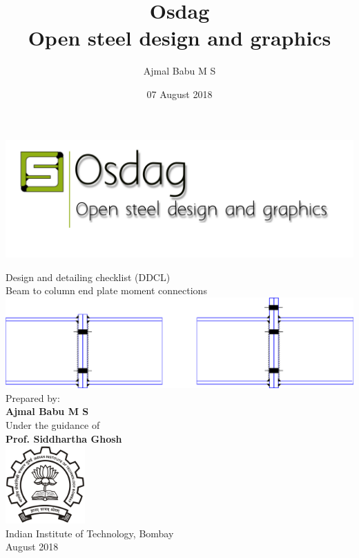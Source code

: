 \documentclass[11.5pt,a4paper,oneside]{report}
\begin{document}
	\title{Osdag\\ Open steel design and graphics}
	\author{Ajmal Babu M S}
	\date{07 August 2018}
\pagestyle{fancy}
\lhead{}
\chead{}
\cfoot{}
\rfoot{\thepage}
\renewcommand{\headrulewidth}{2pt}
\renewcommand{\footrulewidth}{1pt}
\newcommand{\univ}{Indian Institute of Technology, Bombay}
\begin{titlepage}
	\begin{center}
		\begin{center}
			\includegraphics {logoOsdag.png}
		\end{center}
	
			{\LARGE {Design and detailing checklist (DDCL)}}\\
			\vspace{1cm}
			{\LARGE {Beam to column end plate  moment connections}} \\
			\vspace{1cm}		
			\includegraphics[width=7in]{FP_OWE.png} \\	
			\vspace{3cm}
			 {\small {Prepared by:}} \\
			 {\Large \textbf {Ajmal Babu M S}} \\	
			\vspace{0.5cm}	
			{\small {Under the guidance of} }\\
			{\Large \textbf {Prof. Siddhartha Ghosh}} \\	
			\vspace{1cm}
			\centering
			\includegraphics[width=1.2in]{logo.png} \\	
 			\vspace{0.5cm}
			{\univ} \\ 
			\vspace{0.15cm}		
			{August 2018}
	\end{center}
\end{titlepage}
\end{document}
